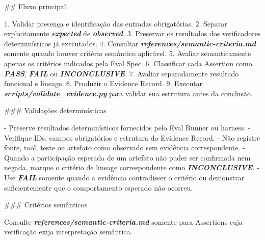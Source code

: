 \documentclass[
  10pt,
  a4paper,
  oneside]{book}
\newenvironment{Shaded}{}{}
\newcommand{\FunctionTok}[1]{\textcolor[rgb]{0.02,0.16,0.49}{#1}}
\newcommand{\InformationTok}[1]{\textcolor[rgb]{0.38,0.63,0.69}{\textbf{\textit{#1}}}}
\newcommand{\NormalTok}[1]{#1}
\newcommand{\SpecialStringTok}[1]{\textcolor[rgb]{0.73,0.40,0.53}{#1}}
\renewenvironment{Shaded}{\begin{snugshade}}{\end{snugshade}}%
\begin{document}
\begin{Shaded}
\begin{Highlighting}[]
\FunctionTok{\#\# Fluxo principal}

\SpecialStringTok{1. }\NormalTok{Validar presença e identificação das entradas obrigatórias.}
\SpecialStringTok{2. }\NormalTok{Separar explicitamente }\InformationTok{\textasciigrave{}expected\textasciigrave{}}\NormalTok{ de }\InformationTok{\textasciigrave{}observed\textasciigrave{}}\NormalTok{.}
\SpecialStringTok{3. }\NormalTok{Preservar os resultados dos verificadores determinísticos já executados.}
\SpecialStringTok{4. }\NormalTok{Consultar }\InformationTok{\textasciigrave{}references/semantic{-}criteria.md\textasciigrave{}}\NormalTok{ somente quando houver critério semântico aplicável.}
\SpecialStringTok{5. }\NormalTok{Avaliar semanticamente apenas os critérios indicados pela Eval Spec.}
\SpecialStringTok{6. }\NormalTok{Classificar cada Assertion como }\InformationTok{\textasciigrave{}PASS\textasciigrave{}}\NormalTok{, }\InformationTok{\textasciigrave{}FAIL\textasciigrave{}}\NormalTok{ ou }\InformationTok{\textasciigrave{}INCONCLUSIVE\textasciigrave{}}\NormalTok{.}
\SpecialStringTok{7. }\NormalTok{Avaliar separadamente resultado funcional e lineage.}
\SpecialStringTok{8. }\NormalTok{Produzir o Evidence Record.}
\SpecialStringTok{9. }\NormalTok{Executar }\InformationTok{\textasciigrave{}scripts/validate\_evidence.py\textasciigrave{}}\NormalTok{ para validar sua estrutura antes da conclusão.}

\FunctionTok{\#\#\# Validações determinísticas}

\SpecialStringTok{{-} }\NormalTok{Preserve resultados determinísticos fornecidos pelo Eval Runner ou harness.}
\SpecialStringTok{{-} }\NormalTok{Verifique IDs, campos obrigatórios e estrutura do Evidence Record.}
\SpecialStringTok{{-} }\NormalTok{Não registre fonte, tool, teste ou artefato como observado sem evidência correspondente.}
\SpecialStringTok{{-} }\NormalTok{Quando a participação esperada de um artefato não puder ser confirmada nem negada, marque o critério de lineage correspondente como }\InformationTok{\textasciigrave{}INCONCLUSIVE\textasciigrave{}}\NormalTok{.}
\SpecialStringTok{{-} }\NormalTok{Use }\InformationTok{\textasciigrave{}FAIL\textasciigrave{}}\NormalTok{ somente quando a evidência contradisser o critério ou demonstrar suficientemente que o comportamento esperado não ocorreu.}

\FunctionTok{\#\#\# Critérios semânticos}

\NormalTok{Consulte }\InformationTok{\textasciigrave{}references/semantic{-}criteria.md\textasciigrave{}}\NormalTok{ somente para Assertions cuja verificação exija interpretação semântica.}


\end{Highlighting}
\end{Shaded}
\end{document}
